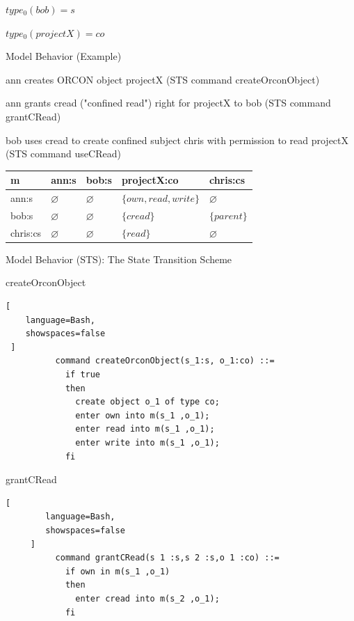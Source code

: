 \documentclass[a4paper]{article}
\begin{document}
\begin{multicols}{3}
\begin{itemize*}
\begin{itemize*}
\begin{itemize*}
\begin{itemize*}
                    \item $type_0(bob)=s$
                    \item $type_0(projectX)=co$
                \end{itemize*}
            \end{itemize*}
        \end{itemize*}
        \item Model Behavior (Example)
        \begin{itemize*}
            \item ann creates ORCON object projectX (STS command createOrconObject)
            \item ann grants cread ("confined read") right for projectX to bob (STS command grantCRead)
            \item bob uses cread to create confined subject chris with permission to read projectX (STS command useCRead)
        \end{itemize*}
    \end{itemize*}

    \begin{tabular}{l|l|l|l|l}
        m        & ann:s         & bob:s         & projectX:co            & chris:cs      \\\hline
        ann:s    & $\varnothing$ & $\varnothing$ & $\{own, read, write\}$ & $\varnothing$ \\
        bob:s    & $\varnothing$ & $\varnothing$ & $\{cread\}$            & $\{parent\}$  \\
        chris:cs & $\varnothing$ & $\varnothing$ & $\{read\}$             & $\varnothing$
    \end{tabular}

    Model Behavior (STS): The State Transition Scheme
    \begin{itemize*}
        \item createOrconObject
        \begin{lstlisting}[
    language=Bash,
    showspaces=false
 ]
          command createOrconObject(s_1:s, o_1:co) ::=
            if true
            then
              create object o_1 of type co;
              enter own into m(s_1 ,o_1);
              enter read into m(s_1 ,o_1);
              enter write into m(s_1 ,o_1);
            fi
  \end{lstlisting}

        \item grantCRead
        \begin{lstlisting}[
        language=Bash,
        showspaces=false
     ]
          command grantCRead(s 1 :s,s 2 :s,o 1 :co) ::=
            if own in m(s_1 ,o_1)
            then
              enter cread into m(s_2 ,o_1);
            fi 
        \end{lstlisting}


\end{itemize*}
\end{multicols}
\end{document}
